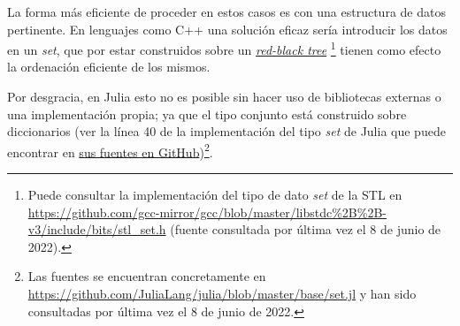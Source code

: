 La forma más eficiente de proceder en estos casos
es con una estructura de datos pertinente. 
En lenguajes como C++ una solución eficaz sería introducir los datos en 
un \textit{set}, que por estar construidos sobre un \href{https://en.wikipedia.org/wiki/Red–black_tree}{\textit{red-black tree}}
\footnote{ 
    Puede consultar la implementación del tipo de dato \textit{set} de la STL en 
    \url{https://github.com/gcc-mirror/gcc/blob/master/libstdc\%2B\%2B-v3/include/bits/stl_set.h}
    (fuente consultada por última vez el 8 de junio de 2022).      
}
tienen como efecto la ordenación eficiente de los mismos. 

\setlength{\marginparwidth}{\smallMarginSize}
\reversemarginpar
{}
\setlength{\marginparwidth}{\bigMarginSize}
\normalmarginpar
Por desgracia, en Julia esto no es posible sin hacer uso de bibliotecas externas o una implementación propia; ya que el tipo conjunto está
 construido sobre diccionarios
 (ver la línea 40 de la implementación del tipo \textit{set} de Julia que puede
 encontrar en   \href{https://github.com/JuliaLang/julia/blob/master/base/set.jl}{sus fuentes en GitHub})\footnote{
     Las fuentes se encuentran concretamente en 
     \url{https://github.com/JuliaLang/julia/blob/master/base/set.jl}
     y han sido consultadas por última vez el 8 de junio de 2022.
 }.

